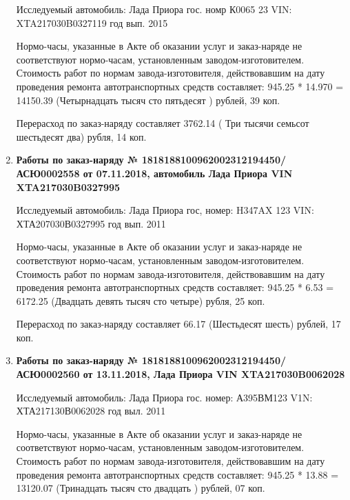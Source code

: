 \begin{enumerate}
Исследуемый автомобиль:  Лада Приора гос. номр К0065 23 VIN: XTA217030B0327119 год вып. 2015



Нормо-часы, указанные в Акте об оказании услуг и заказ-наряде не соответствуют нормо-часам,  установленным заводом-изготовителем.\\
Стоимость работ по нормам завода-изготовителя, действовавшим на дату проведения ремонта автотранспортных средств составляет: 945.25 * 14.970 = 14150.39 (Четырнадцать тысяч сто пятьдесят ) рублей, 39 коп.

Перерасход по заказ-наряду составляет 3762.14 ( Три тысячи семьсот шестьдесят два) рубля, 14 коп.  
\vspace{3mm}




\item \par\textbf{{Работы по заказ-наряду № 1818188100962002312194450/\-АСЮ0002558 от 07.11.2018, автомобиль Лада Приора  VIN XTA217030B0327995}}


Исследуемый автомобиль:  Лада Приора гос, номер: H347AX 123 VIN: ХТА207030В0327995 год вып. 2011



Нормо-часы, указанные в Акте об оказании услуг и заказ-наряде не соответствуют нормо-часам,  установленным заводом-изготовителем.\\
Стоимость работ по нормам завода-изготовителя, действовавшим на дату проведения ремонта автотранспортных средств составляет: 945.25 * 6.53 = 6172.25 (Двадцать девять тысяч сто четыре) рубля, 25 коп.

Перерасход по заказ-наряду составляет 66.17 (Шестьдесят шесть) рублей, 17 коп.  
\vspace{3mm}






\item \par\textbf{{Работы по заказ-наряду  № 1818188100962002312194450/\-АСЮ0002560 от 13.11.2018, Лада Приора VIN  XTA217030B0062028
}}

Исследуемый автомобиль:  Лада Приора гос. номер: А395ВМ123 V1N: ХТА217130В0062028 год выл. 2011




Нормо-часы, указанные в Акте об оказании услуг и заказ-наряде не соответствуют нормо-часам,  установленным заводом-изготовителем.\\
Стоимость работ по нормам завода-изготовителя, действовавшим на дату проведения ремонта автотранспортных средств составляет: 945.25 * 13.88 = 13120.07 (Тринадцать тысяч сто двадцать ) рублей, 07 коп.


\end{enumerate}
